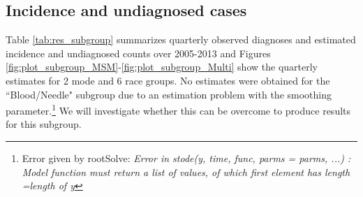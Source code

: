\documentclass{article}\usepackage[]{graphicx}\usepackage[]{color}
\begin{document}
\subsection{Incidence and undiagnosed cases}
\label{sec:undiagBySubgroup}
Table \ref{tab:res_subgroup} summarizes quarterly observed diagnoses and estimated incidence and undiagnosed counts over 2005-2013 and Figures \ref{fig:plot_subgroup_MSM}-\ref{fig:plot_subgroup_Multi} show the quarterly estimates for 2 mode and 6 race groups. No estimates were obtained for the ``Blood/Needle" subgroup due to an estimation problem with the smoothing parameter.\footnote{Error given by rootSolve: \emph{Error in stode(y, time, func, parms = parms, ...) : 
  Model function must return a list of values, of which first element has length =length of y}} We will investigate whether this can be overcome to produce results for this subgroup.
\end{document}
